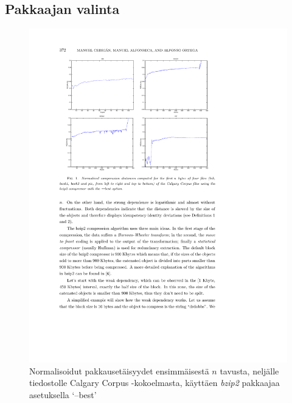 \documentclass[12pt,finnish,draft]{tktltiki2}
\theoremstyle{definition}
\theoremstyle{remark}
\begin{document}

  \subsection{Pakkaajan valinta} %
  \label{sub:pakkaajan_valinta}

    \begin{figure}[t]
      \begin{center}
        \immediate{}
          \includegraphics{img/bzip2-best}
      \end{center}
      \caption{Normalisoidut pakkausetäisyydet ensimmäisestä $n$ tavusta, neljälle tiedostolle Calgary Corpus -kokoelmasta, käyttäen \emph{bzip2} pakkaajaa asetuksella `--best' \cite{cebrian2005common}}
      \label{fig:(bzip2-best)}
    \end{figure}
\end{document}
